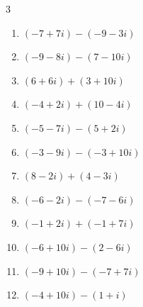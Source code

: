 \begin{multicols}{3}
\begin{enumerate}
        \phantom{$\displaystyle =4i$}

  \item $\displaystyle (-7+7i) - (-9-3i)$

        \phantom{$\displaystyle =2+10i$}

  \item $\displaystyle (-9-8i) - (7-10i)$

        \phantom{$\displaystyle =-16+2i$}

  \item $\displaystyle (6+6i) + (3+10i)$

        \phantom{$\displaystyle =9+16i$}

  \item $\displaystyle (-4+2i) + (10-4i)$

        \phantom{$\displaystyle =6-2i$}

  \item $\displaystyle (-5-7i) - (5+2i)$

        \phantom{$\displaystyle =-10-9i$}

  \item $\displaystyle (-3-9i) - (-3+10i)$

        \phantom{$\displaystyle =-19i$}

  \item $\displaystyle (8-2i) + (4-3i)$

        \phantom{$\displaystyle =12-5i$}

  \item $\displaystyle (-6-2i) - (-7-6i)$

        \phantom{$\displaystyle =1+4i$}

  \item $\displaystyle (-1+2i) + (-1+7i)$

        \phantom{$\displaystyle =-2+9i$}

  \item $\displaystyle (-6+10i) - (2-6i)$

        \phantom{$\displaystyle =-8+16i$}

  \item $\displaystyle (-9+10i) - (-7+7i)$

        \phantom{$\displaystyle =-2+3i$}

  \item $\displaystyle (-4+10i) - (1+i)$

        \phantom{$\displaystyle =-5+9i$}

\columnbreak %

\resetques


\end{enumerate}
\end{multicols}
